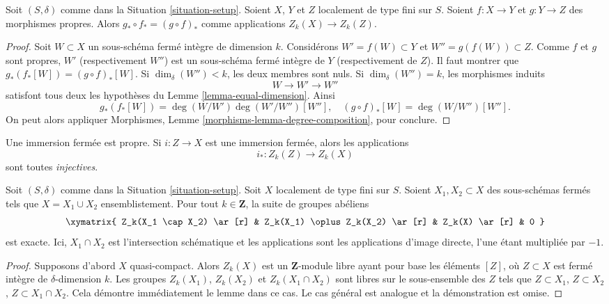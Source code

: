\begin{lemma}
\label{lemma-compose-pushforward}
Soit $(S, \delta)$ comme dans la Situation \ref{situation-setup}.
Soient $X$, $Y$ et $Z$ localement de type fini sur $S$.
Soient $f : X \to Y$ et $g : Y \to Z$ des morphismes propres.
Alors $g_* \circ f_* = (g \circ f)_*$ comme applications $Z_k(X) \to Z_k(Z)$.
\end{lemma}

\begin{proof}
Soit $W \subset X$ un sous-schéma fermé intègre de dimension $k$.
Considérons $W' = f(W) \subset Y$ et $W'' = g(f(W)) \subset Z$.
Comme $f$ et $g$ sont propres, $W'$ (respectivement $W''$) est
un sous-schéma fermé intègre de $Y$ (respectivement de $Z$).
Il faut montrer que $g_*(f_*[W]) = (g \circ f)_*[W]$.
Si $\dim_\delta(W'') < k$, les deux membres sont nuls.
Si $\dim_\delta(W'') = k$, les morphismes induits
$$
W \longrightarrow
W' \longrightarrow
W''
$$
satisfont tous deux les hypothèses du Lemme \ref{lemma-equal-dimension}. Ainsi
$$
g_*(f_*[W]) = \deg(W/W')\deg(W'/W'')[W''],
\quad
(g \circ f)_*[W] = \deg(W/W'')[W''].
$$
On peut alors appliquer
Morphismes, Lemme \ref{morphisms-lemma-degree-composition},
pour conclure.
\end{proof}

\noindent
Une immersion fermée est propre. Si $i : Z \to X$ est une immersion fermée,
alors les applications
$$
i_* : Z_k(Z) \longrightarrow Z_k(X)
$$
sont toutes {\it injectives}.

\begin{lemma}
\label{lemma-exact-sequence-closed}
Soit $(S, \delta)$ comme dans la Situation \ref{situation-setup}.
Soit $X$ localement de type fini sur $S$. Soient $X_1, X_2 \subset X$
des sous-schémas fermés tels que $X = X_1 \cup X_2$ ensemblistement.
Pour tout $k \in \mathbf{Z}$, la suite de groupes abéliens
$$
\xymatrix{
Z_k(X_1 \cap X_2) \ar[r] &
Z_k(X_1) \oplus Z_k(X_2) \ar[r] &
Z_k(X) \ar[r] &
0
}
$$
est exacte. Ici, $X_1 \cap X_2$ est l'intersection schématique et
les applications sont les applications d'image directe, l'une étant multipliée par $-1$.
\end{lemma}

\begin{proof}
Supposons d'abord $X$ quasi-compact. Alors $Z_k(X)$ est un $\mathbf{Z}$-module libre
ayant pour base les éléments $[Z]$, où $Z \subset X$ est fermé intègre
de $\delta$-dimension $k$. Les groupes
$Z_k(X_1)$, $Z_k(X_2)$ et $Z_k(X_1 \cap X_2)$ sont libres sur le sous-ensemble des
$Z$ tels que $Z \subset X_1$, $Z \subset X_2$, $Z \subset X_1 \cap X_2$.
Cela démontre immédiatement le lemme dans ce cas. Le cas général est analogue
et la démonstration est omise.
\end{proof}

